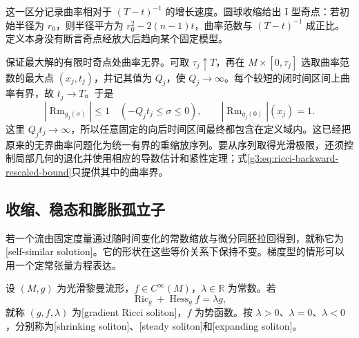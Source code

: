 这一区分记录曲率相对于 \((T-t)^{-1}\) 的增长速度。圆球收缩给出 I 型奇点：若初始半径为 \(r_0\)，则半径平方为 \(r_0^2-2(n-1)t\)，曲率范数与 \((T-t)^{-1}\) 成正比。定义本身没有断言奇点经放大后趋向某个固定模型。

\ProseParagraphBreak
{}保证最大解的有限时奇点处曲率无界。可取 \(\tau_j\uparrow T\)，再在 \(M\times[0,\tau_j]\) 选取曲率范数的最大点 \((x_j,t_j)\)，并记其值为 \(Q_j\)，使 \(Q_j\to\infty\)。每个较短的闭时间区间上曲率有界，故 \(t_j\to T\)。于是
\begin{equation}\label{g3:eq:ricci-backward-rescaled-bound}
	|\operatorname{Rm}_{g_j(\sigma)}|\le1
	\quad(-Q_jt_j\le\sigma\le0),
	\qquad |\operatorname{Rm}_{g_j(0)}|(x_j)=1.
\end{equation}
这里 \(Q_jt_j\to\infty\)，所以任意固定的向后时间区间最终都包含在定义域内。这已经把原来的无界曲率问题化为统一有界的重缩放序列。要从序列取得光滑极限，还须控制局部几何的退化并使用相应的导数估计和紧性定理；式\eqref{g3:eq:ricci-backward-rescaled-bound}只提供其中的曲率界。

\subsection{收缩、稳态和膨胀孤立子}
\label{g3:subsec:2704:02}
若一个流由固定度量通过随时间变化的常数缩放与微分同胚拉回得到，就称它为[self-similar solution]。它的形状在这些等价关系下保持不变。梯度型的情形可以用一个定常张量方程表达。

\begin{definition}\label{g3:def:gradient-ricci-soliton}
	设 \((M,g)\) 为光滑黎曼流形，\(f\in C^\infty(M)\)，\(\lambda\in\mathbb R\) 为常数。若
	\begin{equation}\label{g3:eq:gradient-ricci-soliton}
		\operatorname{Ric}_g+\operatorname{Hess}_g f=\lambda g,
	\end{equation}
	就称 \((g,f,\lambda)\) 为[gradient Ricci soliton]，\(f\) 为势函数。按 \(\lambda>0\)、\(\lambda=0\)、\(\lambda<0\)，分别称为[shrinking soliton]、[steady soliton]和[expanding soliton]。
\end{definition}

